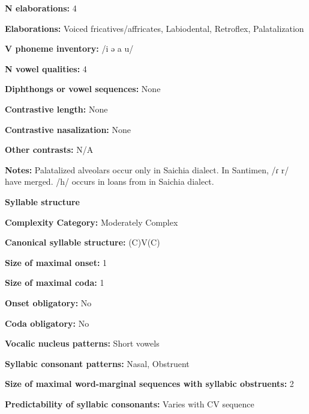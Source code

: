 \textbf{N elaborations:} 4



\textbf{Elaborations:} Voiced fricatives/affricates, Labiodental, Retroflex, Palatalization



\textbf{V phoneme inventory:} /i ə a u/



\textbf{N vowel qualities:} 4



\textbf{Diphthongs or vowel sequences:} None



\textbf{Contrastive length:} None



\textbf{Contrastive nasalization:} None



\textbf{Other contrasts:} N/A



\textbf{Notes:} Palatalized alveolars occur only in Saichia dialect. In Santimen, /ɾ r/ have merged. /h/ occurs in loans from  in Saichia dialect.



\textbf{Syllable structure}



\textbf{Complexity Category:} Moderately Complex



\textbf{Canonical syllable structure:} (C)V(C) \citep[31-34]{Chang2006}



\textbf{Size of maximal onset:} 1



\textbf{Size of maximal coda:} 1



\textbf{Onset obligatory:} No



\textbf{Coda obligatory:} No



\textbf{Vocalic nucleus patterns:} Short vowels



\textbf{Syllabic consonant patterns:} Nasal, Obstruent



\textbf{Size of maximal word{}-marginal sequences with syllabic obstruents:} 2



\textbf{Predictability of syllabic consonants:} Varies with CV sequence



